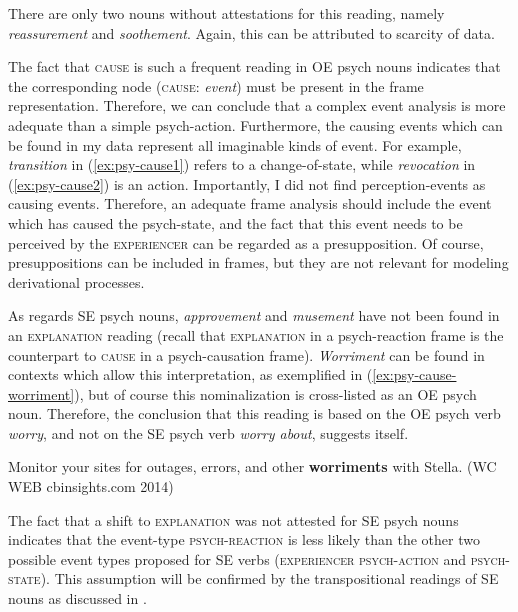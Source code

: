 \noindent There are only two nouns without attestations for this reading, namely \textit{reassurement} and \textit{soothement}. Again, this can be attributed to scarcity of data.

The fact that \textsc{cause} is such a frequent reading in OE psych nouns indicates that the corresponding node (\textsc{cause:} \textit{event}) must be present in the frame representation. Therefore, we can conclude that a complex event analysis is more adequate than a simple psych-action.
Furthermore, the causing events which can be found in my data represent all imaginable kinds of event. For example, \textit{transition} in (\ref{ex:psy-cause1}) refers to a change-of-state, while \textit{revocation} in (\ref{ex:psy-cause2}) is an action. Importantly, I did not find perception-events as causing events. Therefore, an adequate frame analysis should include the event which has caused the psych-state, and the fact that this event needs to be perceived by the \textsc{experiencer} can be regarded as a presupposition. Of course, presuppositions can be included in frames, but they are not relevant for modeling derivational processes. 

As regards SE psych nouns, \textit{approvement} and \textit{musement} have not been found in an \textsc{explanation} reading (recall that \textsc{explanation} in a psych-reaction frame is the counterpart to \textsc{cause} in a psych-causation frame). \textit{Worriment} can be found in contexts which allow this interpretation, as exemplified in (\ref{ex:psy-cause-worriment}), but of course this nominalization is cross-listed as an OE psych noun. Therefore, the conclusion that this reading is based on the OE psych verb \textit{worry}, and not on the SE psych verb \textit{worry about}, suggests itself. 

\begin{exe}
	\ex \label{ex:psy-cause-worriment}
	Monitor your sites for outages, errors, and other \textbf{worriments} with Stella. {\small(\acs{WC} WEB cbinsights.com 2014)}
\end{exe}

\noindent The fact that a shift to \textsc{explanation} was not attested for SE psych nouns indicates that the event-type \textsc{psych-reaction} is less likely than the other two possible event types proposed for SE verbs (\textsc{experiencer psych-action} and \textsc{psych-state}). This assumption will be confirmed by the transpositional readings of SE nouns as discussed in . 

